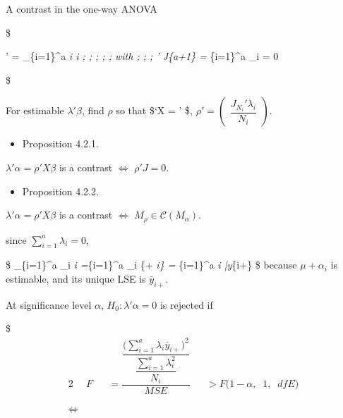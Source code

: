 \documentclass[
]{book}
\providecommand{\tightlist}{%
  \setlength{\itemsep}{0pt}\setlength{\parskip}{0pt}}
\begin{document}
{{{A contrast in the one-way ANOVA

\$

\lambda ' \beta = \sum\_\{i=1\}\^{}a \lambda\emph{i \alpha\emph{i ; ; ; ; ; with ; ; ; \lambda ' J}\{a+1\} = \sum}\{i=1\}\^{}a \lambda\_i = 0

\$

For estimable \(\lambda ' \beta\), find \(\rho\) so that \$\rho`X = \lambda ' \$, \(\rho ' = \begin{pmatrix} \dfrac{J_{N_i} ' \lambda_i}{N_i} \end{pmatrix}\).

\begin{itemize}
\tightlist
\item
  Proposition 4.2.1.
\end{itemize}

\(\lambda ' \alpha = \rho ' X \beta\) is a contrast \(\iff\) \(\rho ' J = 0\).

\begin{itemize}
\tightlist
\item
  Proposition 4.2.2.
\end{itemize}

\(\lambda ' \alpha = \rho ' X \beta\) is a contrast \(\iff\) \(M_\rho \in \mathcal{C}(M_\alpha)\).

since \(\sum_{i=1}^a \lambda_i =0\),

\$
\sum\_\{i=1\}\^{}a \lambda\_i \hat \alpha\emph{i =\sum}\{i=1\}\^{}a \lambda\_i \Big\{\hat \mu + \hat \alpha\emph{i\Big\} = \sum}\{i=1\}\^{}a \lambda\emph{i \bar y}\{i+\}
\$
because \(\mu + \alpha_i\) is estimable, and its unique LSE is \(\bar y_{i+}\).

At significance level \(\alpha\), \(H_0: \lambda ' \alpha=0\) is rejected if

\$
\begin{alignat}{2}


&F 

&&= 

\dfrac
{
\dfrac{ \Big( \sum_{i=1}^a \lambda_i \bar y_{i+} \Big) ^2}
{\dfrac{\sum_{i=1}^a \lambda_i^2}{N_i}}
}
{MSE}

&&> F \Big(1-\alpha, \; \; 1, \; \;  dfE \Big)


\\

\\

\\



\iff


\end{alignat}}}}
\end{document}
